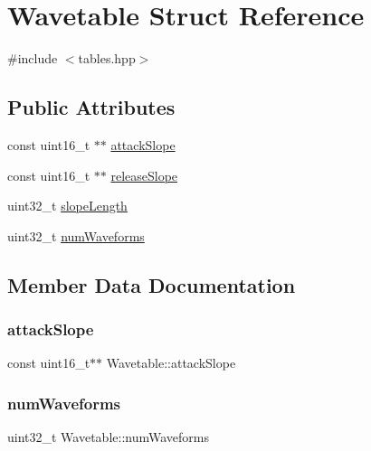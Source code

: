 \hypertarget{struct_wavetable}{}\section{Wavetable Struct Reference}
\label{struct_wavetable}


{\ttfamily \#include $<$tables.\+hpp$>$}

\subsection*{Public Attributes}
\begin{DoxyCompactItemize}
\item 
const uint16\+\_\+t $\ast$$\ast$ \mbox{\hyperlink{struct_wavetable_a3c2ab647e12f0edd17cd6d15dcf278f2}{attack\+Slope}}
\item 
const uint16\+\_\+t $\ast$$\ast$ \mbox{\hyperlink{struct_wavetable_a8beb6f53222606b026f3a62bc4a130db}{release\+Slope}}
\item 
uint32\+\_\+t \mbox{\hyperlink{struct_wavetable_a59998c0be95e8630d258c4e0f7ba030e}{slope\+Length}}
\item 
uint32\+\_\+t \mbox{\hyperlink{struct_wavetable_a122cae720c6ba44a73e17e44c47f048e}{num\+Waveforms}}
\end{DoxyCompactItemize}


\subsection{Member Data Documentation}
\mbox{\label{struct_wavetable_a3c2ab647e12f0edd17cd6d15dcf278f2}} 
\subsubsection{\texorpdfstring{attack\+Slope}{attackSlope}}
{\footnotesize\ttfamily const uint16\+\_\+t$\ast$$\ast$ Wavetable\+::attack\+Slope}

\mbox{\label{struct_wavetable_a122cae720c6ba44a73e17e44c47f048e}} 
\subsubsection{\texorpdfstring{num\+Waveforms}{numWaveforms}}
{\footnotesize\ttfamily uint32\+\_\+t Wavetable\+::num\+Waveforms}

